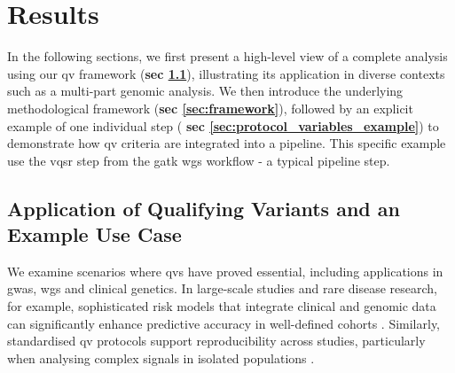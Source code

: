 \section{Results}

In the following sections, we first present a high-level view of a complete analysis using our \ac{qv} framework 
(\textbf{sec \ref{sec:example_high_level}}), illustrating its application in diverse contexts such as a multi-part genomic analysis. We then introduce the underlying methodological framework 
(\textbf{sec \ref{sec:framework}}), followed by an explicit example of one individual step (\textbf{ sec \ref{sec:protocol_variables_example}}) to demonstrate how \ac{qv} criteria are integrated into a pipeline. This specific example use the \ac{vqsr} step from the 
\ac{gatk} \ac{wgs} workflow \cite{auwera_genomics_2020} - a typical pipeline step.

\subsection{Application of Qualifying Variants and an Example Use Case}\label{sec:example_high_level}
We examine scenarios where \ac{qv}s have proved essential, including applications in \ac{gwas}, \ac{wgs} and clinical genetics. In large-scale studies and rare disease research, for example, sophisticated risk models that integrate clinical and genomic data can significantly enhance predictive accuracy in well-defined cohorts \cite{riveros2021integrated, weale2021validation, sun2021polygenic}. Similarly, standardised \ac{qv} protocols support reproducibility across studies, particularly when analysing complex signals in isolated populations \cite{lim2014distribution}.

